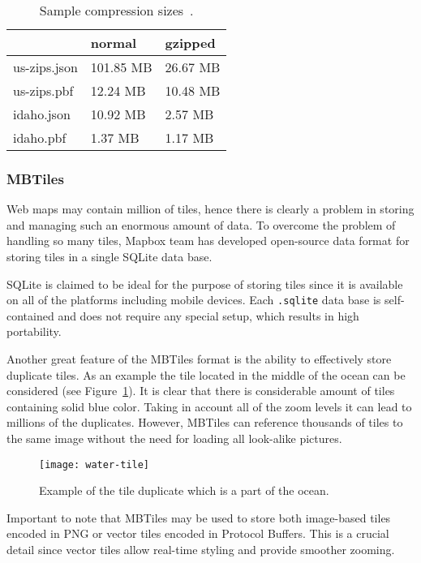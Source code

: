 \begin{table}[ht]
  \renewcommand{\arraystretch}{1.5}
  \centering
  \begin{tabular}{l l l}
    \hline
    & \textbf{normal} & \textbf{gzipped} \\
    \hline
    us-zips.json & 101.85 MB & 26.67 MB \\
    us-zips.pbf & 12.24 MB & 10.48 MB \\
    idaho.json & 10.92 MB & 2.57 MB \\
    idaho.pbf & 1.37 MB & 1.17 MB \\
    \hline
  \end{tabular}

  \caption{Sample compression sizes~\cite{geobuf}.}
  \label{tab:geobuf}
\end{table}

\subsubsection{MBTiles}

Web maps may contain million of tiles, hence there is clearly a problem in storing and managing such
an enormous amount of data. To overcome the problem of handling so many tiles, Mapbox team has
developed open-source data format for storing tiles in a single SQLite data base.

SQLite is claimed to be ideal for the purpose of storing tiles since it is available on all of the
platforms including mobile devices. Each \texttt{.sqlite} data base is self-contained and does not
require any special setup, which results in high portability.

Another great feature of the MBTiles format is the ability to effectively store duplicate tiles. As
an example the tile located in the middle of the ocean can be considered (see
Figure~\ref{pic:water-tile}). It is clear that there is considerable amount of tiles containing
solid blue color. Taking in account all of the zoom levels it can lead to millions of the
duplicates. However, MBTiles can reference thousands of tiles to the same image without
the need for loading all look-alike pictures.

\begin{figure}[ht]
  {\par\centering
  \texttt{[image: water-tile]}
  \par}
  \caption{Example of the tile duplicate which is a part of the ocean.}
  \label{pic:water-tile}
\end{figure}

Important to note that MBTiles may be used to store both image-based tiles encoded in PNG or
vector tiles encoded in Protocol Buffers. This is a crucial detail since vector tiles
allow real-time styling and provide smoother zooming.







